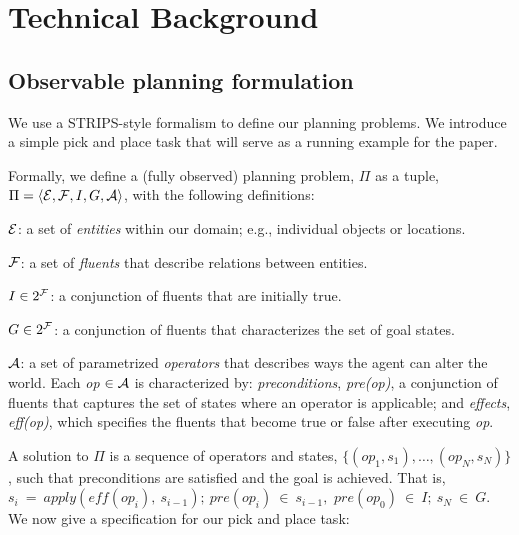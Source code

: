 \section{Technical Background}
\subsection{Observable planning formulation}
\label{sec-formulation}
We use a STRIPS-style formalism to define our planning problems. We
introduce a simple pick and place task that will serve as a running
example for the paper. 

Formally, we define a (fully observed) planning problem, $\Pi$ as a tuple, $\Pi =
\langle \mathcal{E}, \mathcal{F}, I, G, \mathcal{A} \rangle$, with the following definitions:
\begin{tightlist}
\item[$\mathcal{E}$:] a set of \emph{entities} within our domain; e.g., individual objects or locations.
\item[$\mathcal{F}$:] a set of \emph{fluents} that describe relations between
  entities.
\item[$I \in 2^{\mathcal{F}}$:] a conjunction of fluents that are initially true.
\item[$G \in 2^{\mathcal{F}}$:] a conjunction of fluents that characterizes the set of goal states.
\item[$\mathcal{A}$:] a set of parametrized \emph{operators} that describes
  ways the agent can alter the world. Each \emph{op} $\in \mathcal{A}$ is characterized by:
  \emph{preconditions}, \emph{pre(op)}, a conjunction of fluents that captures the set of states where an operator is applicable; and \emph{effects}, \emph{eff(op)}, which specifies the fluents that become true or false after executing \emph{op}.
\end{tightlist}
A solution to $\Pi$ is a sequence of operators and states, $\{(op_1,
s_1),\ldots,(op_N, s_N)\}$, such that preconditions are satisfied and
the goal is achieved. That is, $s_i~=~apply(eff(op_i),~s_{i-1});~
pre(op_i)~\in~s_{i-1},$ $pre(op_0)~\in~I;~s_N~\in~G$. We now give
a specification for our pick and place task:

